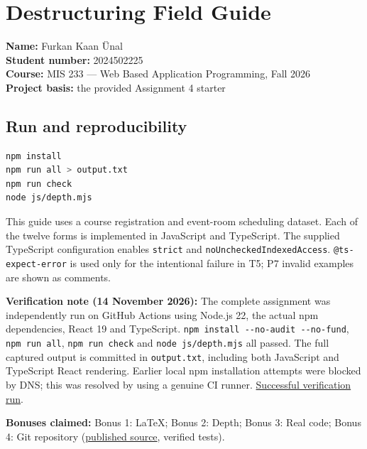 \documentclass[
  10pt,
]{article}
\author{}
\date{}
\newcommand{\passthrough}[1]{#1}
\begin{document}
{
\hypersetup{linkcolor=}
\setcounter{tocdepth}{3}
\tableofcontents
}
\section{Destructuring Field Guide}\label{destructuring-field-guide}

\textbf{Name:} Furkan Kaan Ünal\\
\textbf{Student number:} 2024502225\\
\textbf{Course:} MIS 233 --- Web Based Application Programming, Fall
2026\\
\textbf{Project basis:} the provided Assignment 4 starter

\subsection{Run and reproducibility}\label{run-and-reproducibility}

\begin{lstlisting}[language=bash]
npm install
npm run all > output.txt
npm run check
node js/depth.mjs
\end{lstlisting}

This guide uses a course registration and event-room scheduling dataset.
Each of the twelve forms is implemented in JavaScript and TypeScript.
The supplied TypeScript configuration enables
\passthrough{\lstinline!strict!} and
\passthrough{\lstinline!noUncheckedIndexedAccess!}.
\passthrough{\lstinline!@ts-expect-error!} is used only for the
intentional failure in T5; P7 invalid examples are shown as comments.

\textbf{Verification note (14 November 2026):} The complete assignment
was independently run on GitHub Actions using Node.js 22, the actual npm
dependencies, React 19 and TypeScript.
\passthrough{\lstinline!npm install --no-audit --no-fund!},
\passthrough{\lstinline!npm run all!},
\passthrough{\lstinline!npm run check!} and
\passthrough{\lstinline!node js/depth.mjs!} all passed. The full
captured output is committed in \passthrough{\lstinline!output.txt!},
including both JavaScript and TypeScript React rendering. Earlier local
npm installation attempts were blocked by DNS; this was resolved by
using a genuine CI runner.
\href{https://github.com/furkankaanunal/mis233-assignment4/actions/runs/43533531180}{Successful
verification run}.

\textbf{Bonuses claimed:} Bonus 1: LaTeX; Bonus 2: Depth; Bonus 3: Real
code; Bonus 4: Git repository
(\href{https://github.com/furkankaanunal/mis233-assignment4}{published
source}, verified tests).
\end{document}
